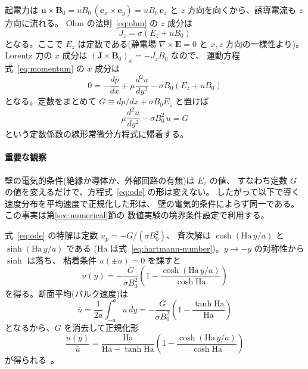 \documentclass{ltjsarticle}   %
\newcommand{\Ha}{\mathrm{Ha}}
\begin{document}
起電力は $\boldsymbol{u}\times\boldsymbol{B}_0
= u B_0\,(\boldsymbol{e}_x\times\boldsymbol{e}_y) = u B_0\,\boldsymbol{e}_z$
と $z$ 方向を向くから、誘導電流も $z$ 方向に流れる。
Ohm の法則~\eqref{eq:ohm} の $z$ 成分は
\begin{equation}
  J_z = \sigma\left(E_z + u B_0\right)
  \label{eq:jz}
\end{equation}
となる。ここで $E_z$ は定数である(静電場 $\nabla\times\boldsymbol{E}=0$ と
$x,z$ 方向の一様性より)。Lorentz 力の $x$ 成分は
$(\boldsymbol{J}\times\boldsymbol{B}_0)_x = -J_z B_0$ なので、
運動方程式~\eqref{eq:momentum} の $x$ 成分は
\begin{equation}
  0 = -\frac{dp}{dx} + \mu\frac{d^2u}{dy^2} - \sigma B_0\left(E_z + u B_0\right)
\end{equation}
となる。定数をまとめて $G \equiv dp/dx + \sigma B_0 E_z$ と置けば
\begin{equation}
  \mu\frac{d^2u}{dy^2} - \sigma B_0^2\, u = G
  \label{eq:ode}
\end{equation}
という定数係数の線形常微分方程式に帰着する。

\paragraph{重要な観察}
壁の電気的条件(絶縁か導体か、外部回路の有無)は $E_z$ の値、
すなわち定数 $G$ の値を変えるだけで、方程式~\eqref{eq:ode} の\textbf{形}は変えない。
したがって以下で導く速度分布を平均速度で正規化した形は、
壁の電気的条件によらず同一である。この事実は第\ref{sec:numerical}節の
数値実験の境界条件設定で利用する。

式~\eqref{eq:ode} の特解は定数 $u_p = -G/(\sigma B_0^2)$、
斉次解は $\cosh(\Ha\, y/a)$ と $\sinh(\Ha\, y/a)$ である
($\Ha$ は式~\eqref{eq:hartmann-number})。$y\to-y$ の対称性から $\sinh$ は落ち、
粘着条件 $u(\pm a)=0$ を課すと
\begin{equation}
  u(y) = -\frac{G}{\sigma B_0^2}
  \left(1 - \frac{\cosh(\Ha\, y/a)}{\cosh\Ha}\right)
  \label{eq:profile-raw}
\end{equation}
を得る。断面平均(バルク速度)は
\begin{equation}
  \bar{u} = \frac{1}{2a}\int_{-a}^{a} u\,dy
  = -\frac{G}{\sigma B_0^2}\left(1 - \frac{\tanh\Ha}{\Ha}\right)
\end{equation}
となるから、$G$ を消去して正規化形
\begin{equation}
  \boxed{\;
  \frac{u(y)}{\bar{u}}
  = \frac{\Ha}{\Ha - \tanh\Ha}
    \left(1 - \frac{\cosh(\Ha\, y/a)}{\cosh\Ha}\right)
  \;}
  \label{eq:profile}
\end{equation}
が得られる~\cite{hartmann1937}。
\end{document}

